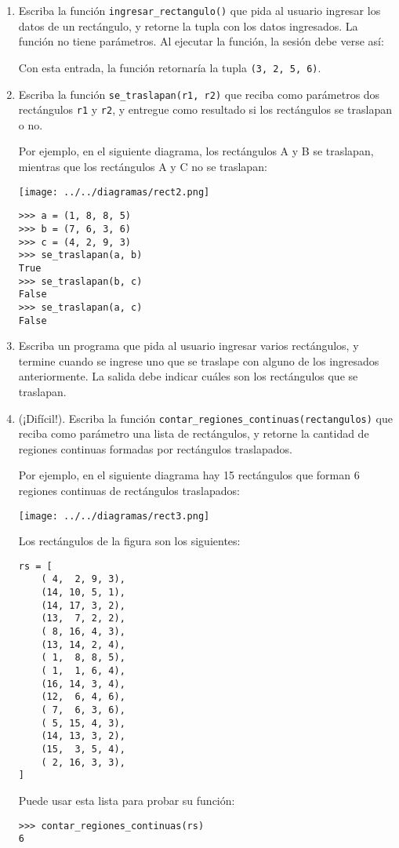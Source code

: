 \begin{enumerate}
\item
  Escriba la función \lstinline!ingresar_rectangulo()! que pida al
  usuario ingresar los datos de un rectángulo, y retorne la tupla con
  los datos ingresados. La función no tiene parámetros. Al ejecutar la
  función, la sesión debe verse así:

  Con esta entrada, la función retornaría la tupla
  \lstinline!(3, 2, 5, 6)!.
\item
  Escriba la función \lstinline!se_traslapan(r1, r2)! que reciba como
  parámetros dos rectángulos \lstinline!r1! y \lstinline!r2!, y entregue
  como resultado si los rectángulos se traslapan o no.

  Por ejemplo, en el siguiente diagrama, los rectángulos A y B se
  traslapan, mientras que los rectángulos A y C no se traslapan:

  \texttt{[image: ../../diagramas/rect2.png]}

\begin{lstlisting}
>>> a = (1, 8, 8, 5)
>>> b = (7, 6, 3, 6)
>>> c = (4, 2, 9, 3)
>>> se_traslapan(a, b)
True
>>> se_traslapan(b, c)
False
>>> se_traslapan(a, c)
False
\end{lstlisting}
\item
  Escriba un programa que pida al usuario ingresar varios rectángulos, y
  termine cuando se ingrese uno que se traslape con alguno de los
  ingresados anteriormente. La salida debe indicar cuáles son los
  rectángulos que se traslapan.
\item
  (¡Difícil!). Escriba la función
  \lstinline!contar_regiones_continuas(rectangulos)! que reciba como
  parámetro una lista de rectángulos, y retorne la cantidad de regiones
  continuas formadas por rectángulos traslapados.

  Por ejemplo, en el siguiente diagrama hay 15 rectángulos que forman 6
  regiones continuas de rectángulos traslapados:

  \texttt{[image: ../../diagramas/rect3.png]}

  Los rectángulos de la figura son los siguientes:

\begin{lstlisting}
rs = [
    ( 4,  2, 9, 3),
    (14, 10, 5, 1),
    (14, 17, 3, 2),
    (13,  7, 2, 2),
    ( 8, 16, 4, 3),
    (13, 14, 2, 4),
    ( 1,  8, 8, 5),
    ( 1,  1, 6, 4),
    (16, 14, 3, 4),
    (12,  6, 4, 6),
    ( 7,  6, 3, 6),
    ( 5, 15, 4, 3),
    (14, 13, 3, 2),
    (15,  3, 5, 4),
    ( 2, 16, 3, 3),
]
\end{lstlisting}

  Puede usar esta lista para probar su función:

\begin{lstlisting}
>>> contar_regiones_continuas(rs)
6
\end{lstlisting}
\end{enumerate}
